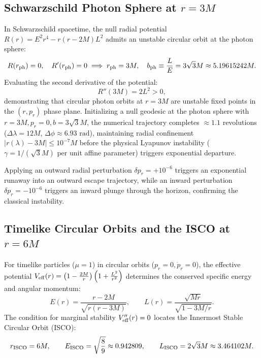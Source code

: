 \subsection{Schwarzschild Photon Sphere at $r = 3M$}
\label{subsec:schwarzschild_photon_sphere}
In Schwarzschild spacetime, the null radial potential $R(r) = E^2 r^4 - r(r - 2M)L^2$ admits an unstable circular orbit at the photon sphere:
\begin{equation}
    R(r_{\rm ph}) = 0, \quad R'(r_{\rm ph}) = 0 \implies r_{\rm ph} = 3M, \quad b_{\rm ph} \equiv \frac{L}{E} = 3\sqrt{3}M \approx 5.19615242M.
    \label{eq:schwarzschild_photon_sphere}
\end{equation}
Evaluating the second derivative of the potential:
\begin{equation}
    R''(3M) = 2 L^2 > 0,
\end{equation}
demonstrating that circular photon orbits at $r = 3M$ are unstable fixed points in the $(r, p_r)$ phase plane. Initializing a null geodesic at the photon sphere with $r = 3M, p_r = 0, b = 3\sqrt{3}M$, the numerical trajectory completes $\approx 1.1$ revolutions ($\Delta\lambda = 12M$, $\Delta\phi \approx 6.93\text{ rad}$), maintaining radial confinement $|r(\lambda) - 3M| \le 10^{-7}M$ before the physical Lyapunov instability ($\gamma = 1/(\sqrt{3}M)$ per unit affine parameter) triggers exponential departure. 

Applying an outward radial perturbation $\delta p_r = +10^{-6}$ triggers an exponential runaway into an outward escape trajectory, while an inward perturbation $\delta p_r = -10^{-6}$ triggers an inward plunge through the horizon, confirming the classical instability.

\subsection{Timelike Circular Orbits and the ISCO at $r = 6M$}
For timelike particles ($\mu = 1$) in circular orbits ($p_r = 0, \dot{p}_r = 0$), the effective potential $V_{\rm eff}(r) = \left(1 - \frac{2M}{r}\right)\left(1 + \frac{L^2}{r^2}\right)$ determines the conserved specific energy and angular momentum:
\begin{equation}
    E(r) = \frac{r - 2M}{\sqrt{r(r - 3M)}}, \qquad L(r) = \frac{\sqrt{Mr}}{\sqrt{1 - 3M/r}}.
    \label{eq:schwarzschild_timelike_circular}
\end{equation}
The condition for marginal stability $V_{\rm eff}''(r) = 0$ locates the Innermost Stable Circular Orbit (ISCO):
\begin{equation}
    r_{\rm ISCO} = 6M, \qquad E_{\rm ISCO} = \sqrt{\frac{8}{9}} \approx 0.942809, \qquad L_{\rm ISCO} = 2\sqrt{3}M \approx 3.464102M.
    \label{eq:schwarzschild_isco}
\end{equation}


